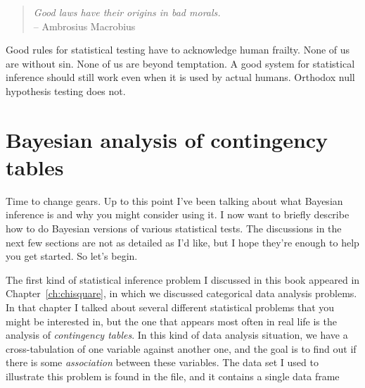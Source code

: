 \begin{quote}
{\it Good laws have their origins in bad morals.}\\
\hspace*{2cm} -- Ambrosius Macrobius
\end{quote}


\noindent
Good rules for statistical testing have to acknowledge human frailty. None of us are without sin. None of us are beyond temptation. A good system for statistical inference should still work even when it is used by actual humans. Orthodox null hypothesis testing does not. 




\section{Bayesian analysis of contingency tables~\label{sec:bayescontingency}}



Time to change gears. Up to this point I've been talking about what Bayesian inference is and why you might consider using it. I now want to briefly describe how to do Bayesian versions of various statistical tests. The discussions in the next few sections are not as detailed as I'd like, but I hope they're enough to help you get started. So let's begin.

The first kind of statistical inference problem I discussed in this book appeared in Chapter~\ref{ch:chisquare}, in which we discussed categorical data analysis problems. In that chapter I talked about several different statistical problems that you might be interested in, but the one that appears most often in real life is the analysis of  {\it contingency tables}. In this kind of data analysis situation, we have a cross-tabulation of one variable against another one, and the goal is to find out if there is some {\it association} between these variables. The data set I used to illustrate this problem is found in the  file, and it contains a single data frame 

